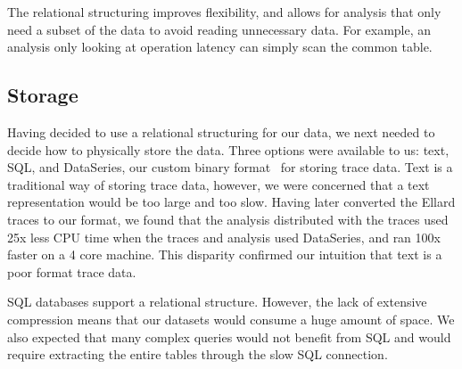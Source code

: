 The relational structuring improves flexibility, and allows for
analysis that only need a subset of the data to avoid reading
unnecessary data.  For example, an analysis only looking at operation
latency can simply scan the common table.

\subsection{Storage}

Having decided to use a relational structuring for our data, we next
needed to decide how to physically store the data.  Three
options were available to us: text, SQL, and DataSeries, our custom
binary format~\cite{DSTechnicalReportSnapshot} for storing trace data.
Text is a traditional way of storing trace data, however, we were
concerned that a text representation would be too large and too slow.
Having later converted the Ellard traces to our format, we found that
the analysis distributed with the traces used 25x less CPU time when
the traces and analysis used DataSeries, and ran 100x faster on a 4
core machine. This disparity confirmed our intuition that text is a
poor format trace data.


SQL databases support a relational structure. However, the lack of 
extensive compression means that our datasets would 
consume a huge amount of space. We also expected that many complex
queries would not benefit from SQL and would require extracting
the entire tables through the slow SQL connection.

